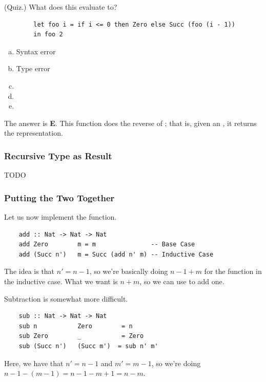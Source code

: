 \documentclass[letterpaper]{article}
\begin{document}
\begin{mdframed}[]
    (Quiz.) What does this evaluate to? 
    \begin{verbatim}
        let foo i = if i <= 0 then Zero else Succ (foo (i - 1))
        in foo 2 \end{verbatim}    
    \begin{enumerate}[(a)]
        \item Syntax error
        \item Type error 
        \item {}
        \item {}
        \item {}
    \end{enumerate}

    \begin{mdframed}[]
        The answer is \textbf{E}. This function does the reverse of ; that is, given an , it returns the  representation. 
    \end{mdframed}
\end{mdframed}

\subsubsection{Recursive Type as Result}
TODO 


\subsubsection{Putting the Two Together}
Let us now implement the  function.
\begin{verbatim}
    add :: Nat -> Nat -> Nat 
    add Zero        m = m               -- Base Case 
    add (Succ n')   m = Succ (add n' m) -- Inductive Case \end{verbatim}
The idea is that $n' = n - 1$, so we're basically doing $n - 1 + m$ for the  function in the inductive case. What we want is $n + m$, so we can use  to add one. 

\bigskip

Subtraction is somewhat more difficult.
\begin{verbatim}
    sub :: Nat -> Nat -> Nat 
    sub n           Zero        = n
    sub Zero        _           = Zero 
    sub (Succ n')   (Succ m')  = sub n' m' 
\end{verbatim}
Here, we have that $n' = n - 1$ and $m' = m - 1$, so we're doing $n - 1 - (m - 1) = n - 1 - m + 1 = n - m$. 
\end{document}
